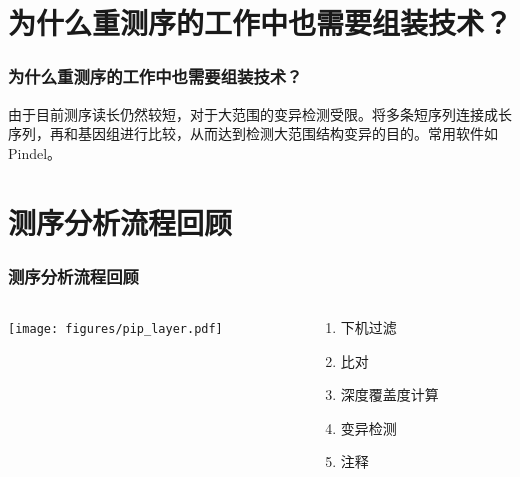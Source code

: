 \documentclass[12pt]{beamer}
\begin{document}
\section{为什么重测序的工作中也需要组装技术？}
\begin{frame}\frametitle{为什么重测序的工作中也需要组装技术？}
由于目前测序读长仍然较短，对于大范围的变异检测受限。将多条短序列连接成长序列，再和基因组进行比较，从而达到检测大范围结构变异的目的。常用软件如Pindel。
\end{frame}

\section{测序分析流程回顾}

\begin{frame}\frametitle{测序分析流程回顾}
  \begin{columns}
    \begin{column}{0.5\textwidth}
      \texttt{[image: figures/pip\_layer.pdf]}      
    \end{column}
    \begin{column}{0.5\textwidth}
      \begin{enumerate}
      \item 下机过滤
      \item 比对
      \item 深度覆盖度计算
      \item 变异检测
      \item 注释
      \end{enumerate}
    \end{column}
  \end{columns}
\end{frame}
\end{document}
